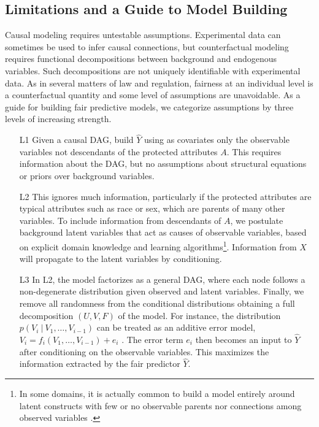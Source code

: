 \subsection{Limitations and a Guide to Model Building}
\label{sec:limit-guide-model}
Causal modeling requires untestable assumptions. Experimental data can
sometimes be used to infer causal connections, but counterfactual
modeling requires functional
decompositions between background and endogenous variables.
Such decompositions are not
uniquely identifiable  with experimental data. As in several
matters of law and regulation, fairness at an individual level is a
counterfactual quantity and some level of assumptions
are unavoidable. As a guide for building fair predictive models, we
categorize assumptions by three levels of increasing strength.
%
\begin{itemize}
\item[L1] Given a causal DAG, build $\hat Y$
  using as covariates only the observable variables  not
  descendants of the protected attributes $A$. This
  requires information about the DAG, but no
  assumptions about structural equations or priors over background
  variables. %
\item[L2] This ignores much information, particularly if the protected
  attributes are typical attributes such as race or sex,
  which are parents of many other variables. To include information
  from descendants of $A$, we postulate background latent variables
  that act as causes of observable variables, based on explicit domain
  knowledge and learning algorithms\footnote{In some domains, it is
    actually common to build a model entirely around latent constructs
    with few or no observable parents nor connections among observed
    variables \citep{bol:89}.}. Information from $X$ will propagate to
  the latent variables by conditioning.%
 \item[L3] In L2, the model factorizes as a
   general DAG, where each node follows a non-degenerate
   distribution given observed and latent variables. %
   Finally, we remove all randomness from the conditional
   distributions obtaining a full decomposition $(U, V, F)$ of the
   model. %
   For instance, the  distribution
   $p(V_i\ |\ V_1, \dots, V_{i - 1})$ can be treated as an additive
   error model, $V_i = f_i(V_1, \dots, V_{i - 1}) + e_i$
   \citep{peters:14}. The error term $e_i$  then becomes an input
   to $\hat Y$ after conditioning on the observable variables. This
   maximizes the information  extracted
   by the fair predictor $\hat Y$.
\end{itemize}


